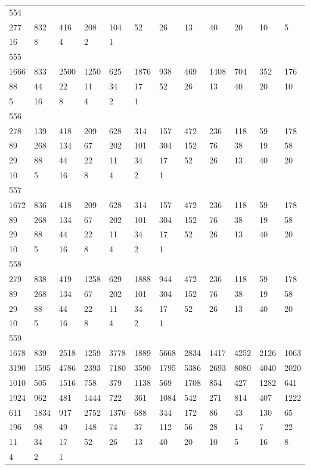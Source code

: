 \begin{longtable}{llllllllllll}
554&&&&&&&&&&&\\
277& 832& 416& 208& 104& 52& 26& 13& 40& 20& 10& 5\\
16& 8& 4& 2& 1& \\

555&&&&&&&&&&&\\
1666& 833& 2500& 1250& 625& 1876& 938& 469& 1408& 704& 352& 176\\
88& 44& 22& 11& 34& 17& 52& 26& 13& 40& 20& 10\\
5& 16& 8& 4& 2& 1& \\

556&&&&&&&&&&&\\
278& 139& 418& 209& 628& 314& 157& 472& 236& 118& 59& 178\\
89& 268& 134& 67& 202& 101& 304& 152& 76& 38& 19& 58\\
29& 88& 44& 22& 11& 34& 17& 52& 26& 13& 40& 20\\
10& 5& 16& 8& 4& 2& 1& \\

557&&&&&&&&&&&\\
1672& 836& 418& 209& 628& 314& 157& 472& 236& 118& 59& 178\\
89& 268& 134& 67& 202& 101& 304& 152& 76& 38& 19& 58\\
29& 88& 44& 22& 11& 34& 17& 52& 26& 13& 40& 20\\
10& 5& 16& 8& 4& 2& 1& \\

558&&&&&&&&&&&\\
279& 838& 419& 1258& 629& 1888& 944& 472& 236& 118& 59& 178\\
89& 268& 134& 67& 202& 101& 304& 152& 76& 38& 19& 58\\
29& 88& 44& 22& 11& 34& 17& 52& 26& 13& 40& 20\\
10& 5& 16& 8& 4& 2& 1& \\

559&&&&&&&&&&&\\
1678& 839& 2518& 1259& 3778& 1889& 5668& 2834& 1417& 4252& 2126& 1063\\
3190& 1595& 4786& 2393& 7180& 3590& 1795& 5386& 2693& 8080& 4040& 2020\\
1010& 505& 1516& 758& 379& 1138& 569& 1708& 854& 427& 1282& 641\\
1924& 962& 481& 1444& 722& 361& 1084& 542& 271& 814& 407& 1222\\
611& 1834& 917& 2752& 1376& 688& 344& 172& 86& 43& 130& 65\\
196& 98& 49& 148& 74& 37& 112& 56& 28& 14& 7& 22\\
11& 34& 17& 52& 26& 13& 40& 20& 10& 5& 16& 8\\
4& 2& 1& \\


\end{longtable}
